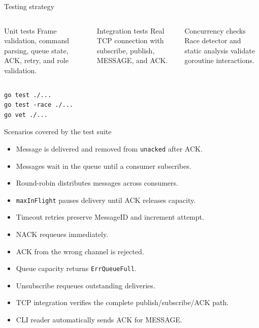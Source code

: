 \documentclass[aspectratio=169,10pt]{beamer}
\newcommand{\code}[1]{\texttt{\small #1}}
\begin{document}
\begin{frame}[fragile]{Testing strategy}
  \begin{columns}[T,onlytextwidth]
      \begin{block}{Unit tests}
        Frame validation, command parsing, queue state, ACK, retry, and role validation.
      \end{block}
      \begin{block}{Integration tests}
        Real TCP connection with subscribe, publish, MESSAGE, and ACK.
      \end{block}
      \begin{block}{Concurrency checks}
        Race detector and static analysis validate goroutine interactions.
      \end{block}
  \end{columns}
  \vspace{.65em}
  \begin{lstlisting}[style=wire]
go test ./...
go test -race ./...
go vet ./...
  \end{lstlisting}
\end{frame}

\begin{frame}{Scenarios covered by the test suite}
  \begin{itemize}
    \item Message is delivered and removed from \code{unacked} after ACK.
    \item Messages wait in the queue until a consumer subscribes.
    \item Round-robin distributes messages across consumers.
    \item \code{maxInFlight} pauses delivery until ACK releases capacity.
    \item Timeout retries preserve MessageID and increment attempt.
    \item NACK requeues immediately.
    \item ACK from the wrong channel is rejected.
    \item Queue capacity returns \code{ErrQueueFull}.
    \item Unsubscribe requeues outstanding deliveries.
    \item TCP integration verifies the complete publish/subscribe/ACK path.
    \item CLI reader automatically sends ACK for MESSAGE.
  \end{itemize}
\end{frame}
\end{document}

